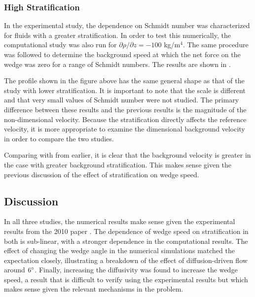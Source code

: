 \documentclass[12pt]{article}
\begin{document}
\subsubsection{High Stratification}

In the experimental study, the dependence on Schmidt number was characterized for fluids with a greater stratification. In order to test this numerically, the computational study was also run for $\partial\rho/\partial z=-100$ kg/m$^{4}$. The same procedure was followed to determine the background speed at which the net force on the wedge was zero for a range of Schmidt numbers. The results are shown in .


The profile shown in the figure above has the same general shape as that of the study with lower stratification. It is important to note that the scale is different and that very small values of Schmidt number were not studied. The primary difference between these results and the previous results is the magnitude of the non-dimensional velocity. Because the stratification directly affects the reference velocity, it is more appropriate to examine the dimensional background velocity in order to compare the two studies.


Comparing  with  from earlier, it is clear that the background velocity is greater in the case with greater background stratification. This makes sense given the previous discussion of the effect of stratification on wedge speed.

\subsection{Discussion}

In all three studies, the numerical results make sense given the experimental results from the 2010 paper \cite{allshouse2010propulsion}. The dependence of wedge speed on stratification in both is sub-linear, with a stronger dependence in the computational results. The effect of changing the wedge angle in the numerical simulations matched the expectation closely, illustrating a breakdown of the effect of diffusion-driven flow around $6\degree$. Finally, increasing the diffusivity was found to increase the wedge speed, a result that is difficult to verify using the experimental results but which makes sense given the relevant mechanisms in the problem.
\end{document}
